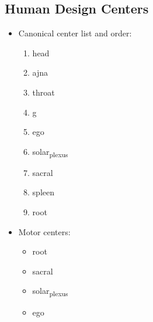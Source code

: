 \documentclass[11pt]{article}
\begin{document}
\subsection{Human Design Centers}
\label{sec:org3304e42}
\begin{itemize}
\item Canonical center list and order:
\begin{enumerate}
\item head
\item ajna
\item throat
\item g
\item ego
\item solar\textsubscript{plexus}
\item sacral
\item spleen
\item root
\end{enumerate}
\item Motor centers:
\begin{itemize}
\item root
\item sacral
\item solar\textsubscript{plexus}
\item ego
\end{itemize}
\end{itemize}
\end{document}
